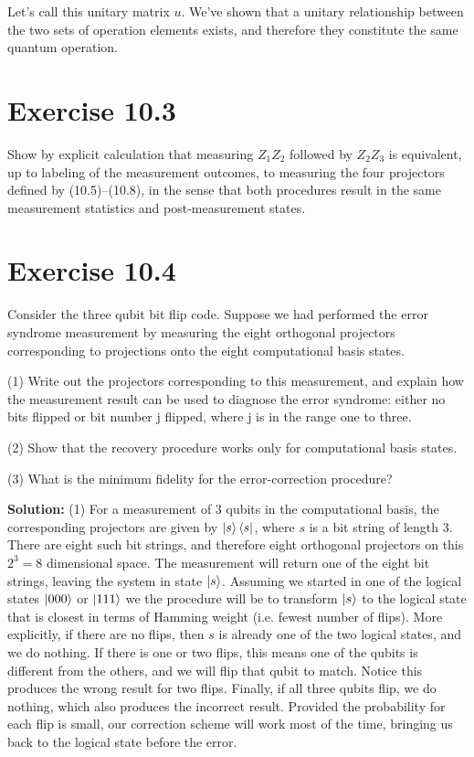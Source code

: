 \documentclass{book}
\begin{document}
    Let's call this unitary matrix $u$. We've shown that a unitary relationship between the two sets of operation elements exists, and therefore they constitute the same quantum operation. 
    
\section*{Exercise 10.3}
    Show by explicit calculation that measuring $Z_1 Z_2$ followed by $Z_2 Z_3$ is equivalent, up to labeling of the measurement outcomes, to measuring the four projectors defined by (10.5)–(10.8), in the sense that both procedures result in the same measurement statistics and post-measurement states.
    
\section*{Exercise 10.4}
    Consider the three qubit bit flip code. Suppose we had performed the error syndrome measurement by measuring the eight orthogonal projectors corresponding to projections onto the eight computational basis states.
    
    (1) Write out the projectors corresponding to this measurement, and explain how the measurement result can be used to diagnose the error syndrome: either no bits flipped or bit number j flipped, where j is in the range one to three.
    
    (2) Show that the recovery procedure works only for computational basis states.
    
    (3) What is the minimum fidelity for the error-correction procedure?
    
    \textbf{Solution:} (1) For a measurement of 3 qubits in the computational basis, the corresponding projectors are given by $\ket{s}\bra{s}$, where $s$ is a bit string of length 3. There are eight such bit strings, and therefore eight orthogonal projectors on this $2^3 = 8$ dimensional space. The measurement will return one of the eight bit strings, leaving the system in state $\ket{s}$. Assuming we started in one of the logical states $\ket{000}$ or $\ket{111}$ we the procedure will be to transform $\ket{s}$ to the logical state that is closest in terms of Hamming weight (i.e. fewest number of flips). More explicitly, if there are no flips, then $s$ is already one of the two logical states, and we do nothing. If there is one or two flips, this means one of the qubits is different from the others, and we will flip that qubit to match. Notice this produces the wrong result for two flips. Finally, if all three qubits flip, we do nothing, which also produces the incorrect result. Provided the probability for each flip is small, our correction scheme will work most of the time, bringing us back to the logical state before the error.
    
\end{document}
